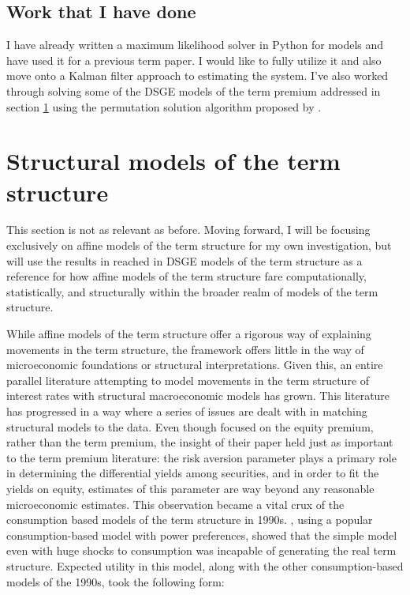 \documentclass{article}
\numberwithin{equation}{section}
\begin{document}
\subsection{Work that I have done}

I have already written a maximum likelihood solver in Python for models and
have used it for a previous term paper. I would like to fully utilize it and
also move onto a Kalman filter approach to estimating the system. I've also
worked through solving some of the DSGE models of the term premium addressed in
section \ref{sec:struct} using the permutation solution algorithm proposed by
\citet{swanson2006higher}.

\section{Structural models of the term structure}\label{sec:struct}

This section is not as relevant as before. Moving forward, I will be focusing
exclusively on affine models of the term structure for my own investigation,
but will use the results in reached in DSGE models of the term structure as
a reference for how affine models of the term structure fare computationally,
statistically,  and structurally within the broader realm of models of the term
structure.

While affine models of the term structure offer a rigorous way of explaining
movements in the term structure, the framework offers little in the way of
microeconomic foundations or structural interpretations. Given this, an entire
parallel literature attempting to model movements in the term structure of
interest rates with structural macroeconomic models has grown. This literature
has progressed in a way where a series of issues are dealt with in matching
structural models to the data. Even though \citet{mehraprescott1985} focused on
the equity premium, rather than the term premium, the insight of their paper
held just as important to the term premium literature: the risk aversion
parameter plays a primary role in determining the differential yields among
securities, and in order to fit the yields on equity, estimates of this
parameter are way beyond any reasonable microeconomic estimates. This
observation became a vital crux of the consumption based models of the term
structure in 1990s. \citet{donaldsonetal1990}, using a popular
consumption-based model with power preferences, showed that the simple model
even with huge shocks to consumption was incapable of generating the real term
structure. Expected utility in this model, along with the other
consumption-based models of the 1990s, took the following form:
\end{document}
